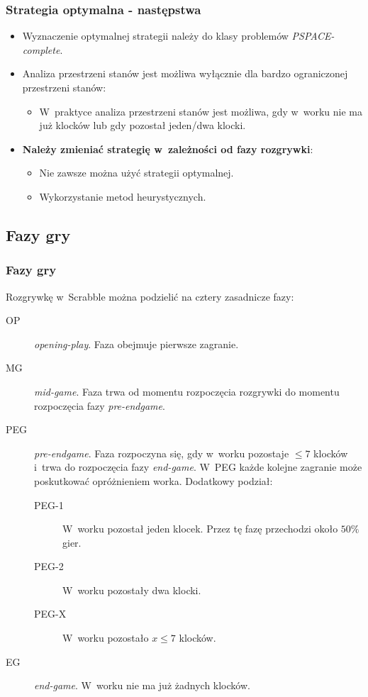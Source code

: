 \documentclass[10pt,a4paper]{beamer}
\begin{document}
\begin{frame}
	\frametitle{Strategia optymalna - następstwa}

	\begin{itemize}
		\item Wyznaczenie optymalnej strategii należy do klasy problemów \emph{PSPACE-complete}.
		\item Analiza przestrzeni stanów jest możliwa wyłącznie dla bardzo ograniczonej przestrzeni stanów:
			\begin{itemize}
				\item W~praktyce analiza przestrzeni stanów jest możliwa, gdy w~worku nie ma już klocków lub gdy pozostał jeden/dwa klocki.
			\end{itemize}
		\item \textbf{Należy zmieniać strategię w~zależności od fazy rozgrywki}:
			\begin{itemize}
				\item Nie zawsze można użyć strategii optymalnej.
				\item Wykorzystanie metod heurystycznych.
			\end{itemize}
	\end{itemize}
\end{frame}

\subsection{Fazy gry}

\begin{frame}
	\frametitle{Fazy gry}
	
	Rozgrywkę w~Scrabble można podzielić na cztery zasadnicze fazy:

	\begin{description}
		\item[OP] \emph{opening-play}. Faza obejmuje pierwsze zagranie.
		\item[MG] \emph{mid-game}. Faza trwa od momentu rozpoczęcia rozgrywki do momentu rozpoczęcia fazy \emph{pre-endgame}.
		\item[PEG] \emph{pre-endgame}. Faza rozpoczyna się, gdy w~worku pozostaje $\leq 7$ klocków i~trwa do rozpoczęcia fazy \emph{end-game}. W~PEG każde kolejne zagranie może poskutkować opróżnieniem worka. Dodatkowy podział:
			\begin{description}
				\item[PEG-1] W~worku pozostał jeden klocek. Przez tę fazę przechodzi około $50\%$ gier.
				\item[PEG-2] W~worku pozostały dwa klocki.
				\item[PEG-X] W~worku pozostało $x \leq 7$ klocków.
			\end{description}
		\item[EG] \emph{end-game}. W~worku nie ma już żadnych klocków.
	\end{description}
\end{frame}
\end{document}
